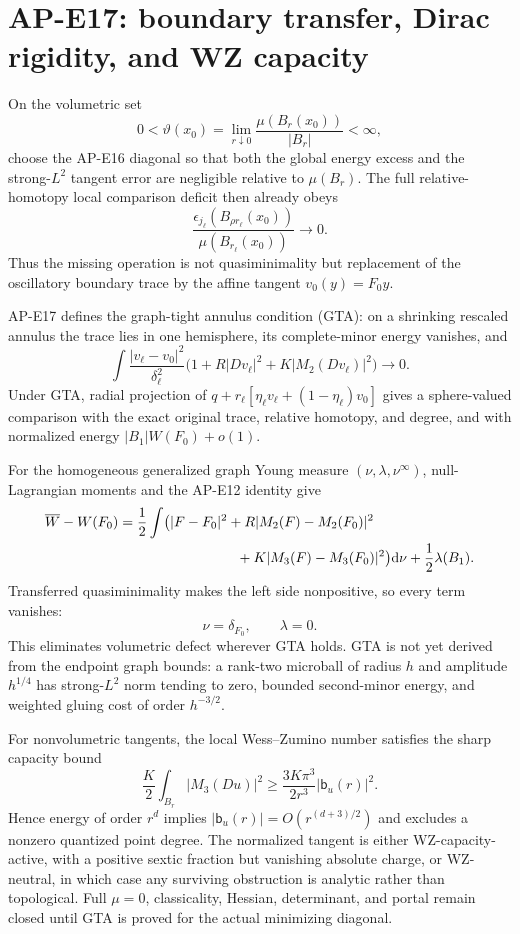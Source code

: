 \section{AP-E17: boundary transfer, Dirac rigidity, and WZ capacity}

On the volumetric set
\[
 0<\vartheta(x_0)=
 \lim_{r\downarrow0}\frac{\mu(B_r(x_0))}{|B_r|}<\infty ,
\]
choose the AP-E16 diagonal so that both the global energy excess and the
strong-$L^2$ tangent error are negligible relative to $\mu(B_r)$.  The full
relative-homotopy local comparison deficit then already obeys
\[
 \frac{\epsilon_{j_\ell}(B_{\rho r_\ell}(x_0))}
 {\mu(B_{r_\ell}(x_0))}\longrightarrow0 .
\]
Thus the missing operation is not quasiminimality but replacement of the
oscillatory boundary trace by the affine tangent $v_0(y)=F_0y$.

AP-E17 defines the graph-tight annulus condition (GTA): on a shrinking
rescaled annulus the trace lies in one hemisphere, its complete-minor energy
vanishes, and
\[
 \int\frac{|v_\ell-v_0|^2}{\delta_\ell^2}
 \bigl(1+R|Dv_\ell|^2+K|M_2(Dv_\ell)|^2\bigr)\longrightarrow0 .
\]
Under GTA, radial projection of
$q+r_\ell[\eta_\ell v_\ell+(1-\eta_\ell)v_0]$ gives a sphere-valued
comparison with the exact original trace, relative homotopy, and degree, and
with normalized energy $|B_1|W(F_0)+o(1)$.

For the homogeneous generalized graph Young measure
$(\nu,\lambda,\nu^\infty)$, null-Lagrangian moments and the AP-E12 identity
give
\begin{align}
 \overline W-W(F_0)
 ={}&\frac12\int\bigl(
 |F-F_0|^2+R|M_2(F)-M_2(F_0)|^2\notag\\
 &\hspace{25mm}+K|M_3(F)-M_3(F_0)|^2\bigr)\dd\nu
 +\frac12\lambda(B_1).
\end{align}
Transferred quasiminimality makes the left side nonpositive, so every term
vanishes:
\[
 \nu=\delta_{F_0},\qquad\lambda=0.
\]
This eliminates volumetric defect wherever GTA holds.  GTA is not yet
derived from the endpoint graph bounds: a rank-two microball of radius $h$
and amplitude $h^{1/4}$ has strong-$L^2$ norm tending to zero, bounded
second-minor energy, and weighted gluing cost of order $h^{-3/2}$.

For nonvolumetric tangents, the local Wess--Zumino number satisfies the sharp
capacity bound
\[
 \frac K2\int_{B_r}|M_3(Du)|^2
 \geq\frac{3K\pi^3}{2r^3}|\mathsf b_u(r)|^2.
\]
Hence energy of order $r^d$ implies
$|\mathsf b_u(r)|=O(r^{(d+3)/2})$ and excludes a nonzero quantized point
degree.  The normalized tangent is either WZ-capacity-active, with a positive
sextic fraction but vanishing absolute charge, or WZ-neutral, in which case
any surviving obstruction is analytic rather than topological.  Full
$\mu=0$, classicality, Hessian, determinant, and portal remain closed until
GTA is proved for the actual minimizing diagonal.

